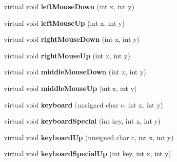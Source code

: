 \begin{DoxyCompactItemize}
\item 
\hypertarget{classBaseGfxApp_aaaccf5a5e923a9465441a5ee712424a8}{virtual void {\bfseries left\-Mouse\-Down} (int x, int y)}\label{classBaseGfxApp_aaaccf5a5e923a9465441a5ee712424a8}

\item 
\hypertarget{classBaseGfxApp_a0a2961a932b02b2f9d7d0bb408f6fb51}{virtual void {\bfseries left\-Mouse\-Up} (int x, int y)}\label{classBaseGfxApp_a0a2961a932b02b2f9d7d0bb408f6fb51}

\item 
\hypertarget{classBaseGfxApp_afa87e6a71220945e41f0424e540125d9}{virtual void {\bfseries right\-Mouse\-Down} (int x, int y)}\label{classBaseGfxApp_afa87e6a71220945e41f0424e540125d9}

\item 
\hypertarget{classBaseGfxApp_a812643d563522a993457dd565c33f8f6}{virtual void {\bfseries right\-Mouse\-Up} (int x, int y)}\label{classBaseGfxApp_a812643d563522a993457dd565c33f8f6}

\item 
\hypertarget{classBaseGfxApp_a2c98cae9bb5ad1fb1832a6d4812670f8}{virtual void {\bfseries middle\-Mouse\-Down} (int x, int y)}\label{classBaseGfxApp_a2c98cae9bb5ad1fb1832a6d4812670f8}

\item 
\hypertarget{classBaseGfxApp_a00fc05e8d9629b72302b5adf014bdb0c}{virtual void {\bfseries middle\-Mouse\-Up} (int x, int y)}\label{classBaseGfxApp_a00fc05e8d9629b72302b5adf014bdb0c}

\item 
\hypertarget{classBaseGfxApp_a6d91e0cb7a3d48cad33956efe7eb36ca}{virtual void {\bfseries keyboard} (unsigned char c, int x, int y)}\label{classBaseGfxApp_a6d91e0cb7a3d48cad33956efe7eb36ca}

\item 
\hypertarget{classBaseGfxApp_a345566e62c9e4ec3705ec4d1c4c75f1f}{virtual void {\bfseries keyboard\-Special} (int key, int x, int y)}\label{classBaseGfxApp_a345566e62c9e4ec3705ec4d1c4c75f1f}

\item 
\hypertarget{classBaseGfxApp_acc4a40ce11edd6b6660a19cb4802a2bf}{virtual void {\bfseries keyboard\-Up} (unsigned char c, int x, int y)}\label{classBaseGfxApp_acc4a40ce11edd6b6660a19cb4802a2bf}

\item 
\hypertarget{classBaseGfxApp_afd14b435ff93b1e7f461cb8bd1a6fd59}{virtual void {\bfseries keyboard\-Special\-Up} (int key, int x, int y)}\label{classBaseGfxApp_afd14b435ff93b1e7f461cb8bd1a6fd59}


\end{DoxyCompactItemize}
